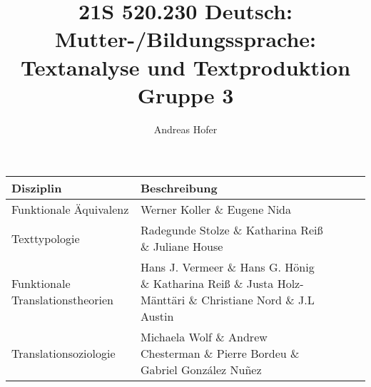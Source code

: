 \documentclass{article}
\title{\vspace{-3cm}21S 520.230 Deutsch: Mutter-/Bildungssprache: Textanalyse und Textproduktion Gruppe 3}
\author{Andreas Hofer}
\begin{document}
	\begin{tabular}{| l | l | l | l | l |}
		\toprule
		Disziplin & Beschreibung \\ \midrule
		Funktionale Äquivalenz & Werner Koller \& Eugene Nida \\ \hline
		Texttypologie & Radegunde Stolze \& Katharina Reiß \& Juliane House \\ \hline
		Funktionale Translationstheorien & Hans J. Vermeer \& Hans G. Hönig \& Katharina Reiß \& Justa Holz-Mänttäri \& Christiane Nord \& J.L Austin \\ \hline
		Translationsoziologie & Michaela Wolf \& Andrew Chesterman \& Pierre Bordeu \& Gabriel González Nuñez 
		\bottomrule
	\end{tabular}
	
\end{document}
